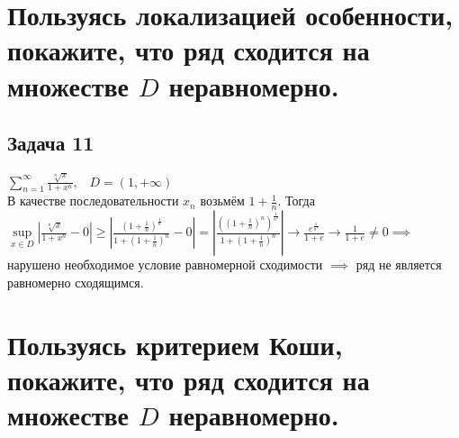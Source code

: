 \documentclass[a4paper, fleqn]{article}
\begin{document}
    
    
    \section*{Пользуясь локализацией особенности, покажите, что ряд сходится на множестве $D$ неравномерно.}
    \subsection*{Задача 11}
    $\sum\limits_{n = 1}^{\infty} \frac{\sqrt[n]{x}}{1 + x^n}, \; \; \; D = (1, +\infty)$ \\
    В качестве последовательности $x_n$ возьмём $1 + \frac{1}{n}$. Тогда \\
    $\sup\limits_{x \in D} \left| \frac{\sqrt[n]{x}}{1 + x^n} - 0 \right| \geq \left| \frac{(1 + \frac{1}{n})^{\frac{1}{n}}}{1 + (1 + \frac{1}{n})^n} - 0 \right| = \left| \frac{((1 + \frac{1}{n})^n)^{\frac{1}{n^2}}}{1 + (1 + \frac{1}{n})^n} \right| \rightarrow \frac{e^{\frac{1}{n^2}}}{1 + e} \rightarrow \frac{1}{1 + e} \neq 0 \implies$ нарушено необходимое условие равномерной сходимости $\implies$ ряд не является равномерно сходящимся. \\
    
    
    
    
    \section*{Пользуясь критерием Коши, покажите, что ряд сходится на множестве $D$ неравномерно.}
\end{document}
